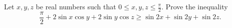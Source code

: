 Let $x,y,z$ be real numbers such that $0\le x,y,z\le\frac{\pi}{2}$. Prove the inequality\[\frac{\pi}{2}+2\sin x\cos y+2\sin y\cos z\ge\sin 2x+\sin 2y+\sin 2z.\]